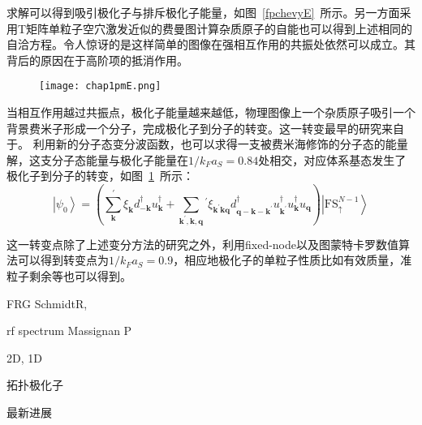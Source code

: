 求解可以得到吸引极化子与排斥极化子能量，如图~\ref{fpchevyE}~所示。另一方面采用T矩阵单粒子空穴激发近似的费曼图计算杂质原子的自能也可以得到上述相同的自洽方程\cite{Combescot20071ph}。令人惊讶的是这样简单的图像在强相互作用的共振处依然可以成立。其背后的原因在于高阶项的抵消作用\cite{Combescot20071ph008full}。
\begin{figure}[!htbp]
    \centering
    \texttt{[image: chap1pmE.png]}
    \label{pmE}
\end{figure}
当相互作用越过共振点，极化子能量越来越低，物理图像上一个杂质原子吸引一个背景费米子形成一个分子，完成极化子到分子的转变。这一转变最早的研究来自于\cite{Mora_pm,Punk_pm,combescot2010analytical}。
利用新的分子态变分波函数，也可以求得一支被费米海修饰的分子态的能量解，这支分子态能量与极化子能量在$1/k_Fa_S=0.84$处相交，对应体系基态发生了极化子到分子的转变，如图~\ref{pmE}~所示：
\begin{equation}
\left|\psi_{0}\right\rangle=\left(\sum_{\mathbf{k}}^{\prime} \xi_{\mathbf{k}} d_{-\mathbf{k}}^{\dagger} u_{\mathbf{k}}^{\dagger}+\sum_{\mathbf{k}^{\prime}, \mathbf{k}, \mathbf{q}}{ }^{\prime} \xi_{\mathbf{k}^{\prime} \mathbf{k q}} d_{\mathbf{q}-\mathbf{k}-\mathbf{k}^{\prime}}^{\dagger} u_{\mathbf{k}^{\prime}}^{\dagger} u_{\mathbf{k}}^{\dagger} u_{\mathbf{q}}\right)\left|\mathrm{FS}_{\uparrow}^{N-1}\right\rangle
\end{equation}

这一转变点除了上述变分方法的研究之外，利用fixed-node\cite{Prokoffermi,Prokofbold}以及图蒙特卡罗\cite{VlietinckMC}数值算法可以得到转变点为$1/k_Fa_S=0.9$，相应地极化子的单粒子性质比如有效质量，准粒子剩余等也可以得到。

FRG SchmidtR,

rf spectrum Massignan P

2D, 1D


拓扑极化子

最新进展














